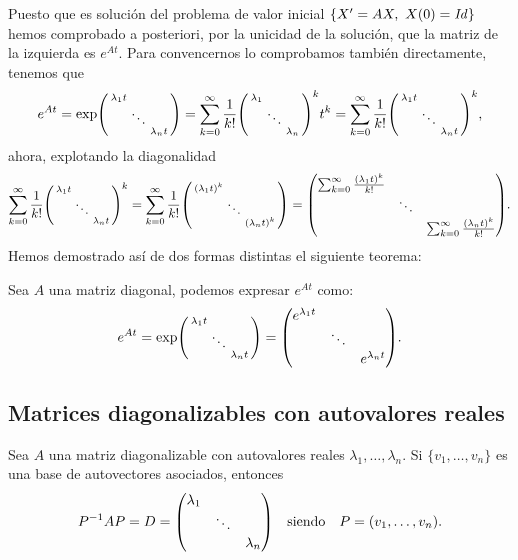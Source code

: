 \documentclass[../ecuaciones_diferenciales.tex]{subfiles}
\begin{document}
Puesto que es solución del problema de valor inicial
\(\set{X' = AX,\ X(0) = \mathit{Id}}\) hemos comprobado a posteriori, por
la unicidad de la solución, que la matriz de la izquierda es \(e^{At}\). Para
convencernos lo comprobamos también directamente, tenemos que
\[e^{At} = \exp\smat{\lambda_1t & & \\ & \ddots & \\ & & \lambda_nt}
	= \sum_{k = 0}^\infty
	\frac{1}{k!}\smat{\lambda_1 & & \\ & \ddots & \\ & & \lambda_n}^k t^k
	= \sum_{k = 0}^\infty
	\frac{1}{k!} \smat{\lambda_1 t & & \\ & \ddots & \\ & & \lambda_n t}^k,
\]
ahora, explotando la diagonalidad
\[\sum_{k = 0}^\infty
	\frac{1}{k!} \smat{\lambda_1 t & & \\ & \ddots & \\ & & \lambda_n t}^k
	= \sum_{k = 0}^\infty
	\frac{1}{k!} \smat{(\lambda_1 t)^k & & \\ & \ddots & \\ & & (\lambda_n t)^k}
	=
	\mat{\sum_{k = 0}^\infty \frac{(\lambda_1 t)^k}{k!} & & \\
		& \ddots &
		\\ & & \sum_{k = 0}^\infty \frac{(\lambda_n t)^k}{k!}}.
\]
Hemos demostrado así de dos formas distintas el siguiente teorema:

\begin{proposition}
	Sea \(A\) una matriz diagonal, podemos expresar \(e^{At}\) como:
	\[e^{At} = \exp\smat{\lambda_1t & & \\ & \ddots & \\ & & \lambda_nt}
		= \mat{e^{\lambda_1 t} & & \\ & \ddots & \\ & & e^{\lambda_n t}}.\]
\end{proposition}

\subsection{Matrices diagonalizables con autovalores reales}

Sea \(A\) una matriz diagonalizable con autovalores reales
\(\lambda_1, \dots, \lambda_n\). Si \(\{v_1, \dots, v_n\}\) es una base de
autovectores asociados, entonces
\[
	P^{-1} A P = D = \mat{\lambda_1 && \\ & \ddots & \\ && \lambda_n}
	\quad \text{siendo} \quad
	P = (v_1, \dots, v_n).
\]
\end{document}
